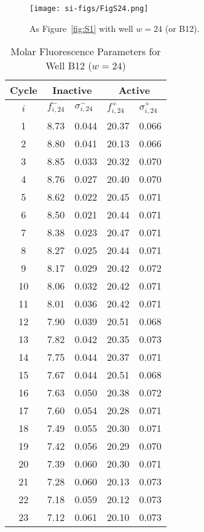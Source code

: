                 \begin{figure}
                    \centering
                    \texttt{[image: si-figs/FigS24.png]}
                    \caption{
                        As Figure~\ref{fig:S1} with well $w=24$ (or B12).
                    }
                \end{figure}
                \clearpage
    \begin{table}
        \caption{Molar Fluorescence Parameters for Well B12 ($w=24$)}
        \centering
        \begin{tabular}{c|ll|ll}
            Cycle & \multicolumn{2}{c|}{Inactive} & \multicolumn{2}{c}{Active} \\
            \hline
            $i$ & $f_{i,24}^{-}$ & $\sigma_{i,24}^{-}$ &  $f_{i,24}^{+}$ & $\sigma_{i,24}^{+}$ \\
            \hline
    1 & 8.73 & 0.044 & 20.37 & 0.066 \\
2 & 8.80 & 0.041 & 20.13 & 0.066 \\
3 & 8.85 & 0.033 & 20.32 & 0.070 \\
4 & 8.76 & 0.027 & 20.40 & 0.070 \\
5 & 8.62 & 0.022 & 20.45 & 0.071 \\
6 & 8.50 & 0.021 & 20.44 & 0.071 \\
7 & 8.38 & 0.023 & 20.47 & 0.071 \\
8 & 8.27 & 0.025 & 20.44 & 0.071 \\
9 & 8.17 & 0.029 & 20.42 & 0.072 \\
10 & 8.06 & 0.032 & 20.42 & 0.071 \\
11 & 8.01 & 0.036 & 20.42 & 0.071 \\
12 & 7.90 & 0.039 & 20.51 & 0.068 \\
13 & 7.82 & 0.042 & 20.35 & 0.073 \\
14 & 7.75 & 0.044 & 20.37 & 0.071 \\
15 & 7.67 & 0.044 & 20.51 & 0.068 \\
16 & 7.63 & 0.050 & 20.38 & 0.072 \\
17 & 7.60 & 0.054 & 20.28 & 0.071 \\
18 & 7.49 & 0.055 & 20.30 & 0.071 \\
19 & 7.42 & 0.056 & 20.29 & 0.070 \\
20 & 7.39 & 0.060 & 20.30 & 0.071 \\
21 & 7.28 & 0.060 & 20.13 & 0.073 \\
22 & 7.18 & 0.059 & 20.12 & 0.073 \\
23 & 7.12 & 0.061 & 20.10 & 0.073 \\

\end{tabular}
\end{table}
